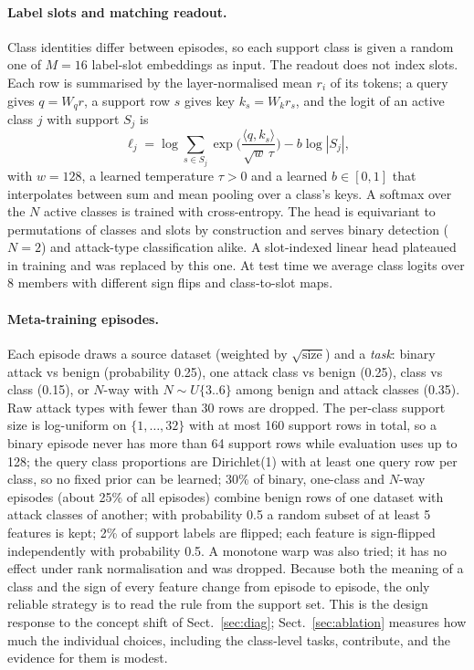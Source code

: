 \documentclass[pdflatex,sn-mathphys-num]{sn-jnl}%
\begin{document}
\paragraph{Label slots and matching readout.}
Class identities differ between episodes, so each support class is given a random one of $M=16$ label-slot embeddings as input.
The readout does not index slots.
Each row is summarised by the layer-normalised mean $r_i$ of its tokens; a query gives $q=W_q r$, a support row $s$ gives key $k_s=W_k r_s$, and the logit of an active class $j$ with support $S_j$ is
\begin{equation}
\ell_j=\log\!\!\sum_{s\in S_j}\exp\!\Big(\frac{\langle q,k_s\rangle}{\sqrt{w}\,\tau}\Big)-b\log|S_j|,
\end{equation}
with $w=128$, a learned temperature $\tau>0$ and a learned $b\in[0,1]$ that interpolates between sum and mean pooling over a class's keys.
A softmax over the $N$ active classes is trained with cross-entropy.
The head is equivariant to permutations of classes and slots by construction and serves binary detection ($N=2$) and attack-type classification alike.
A slot-indexed linear head plateaued in training and was replaced by this one.
At test time we average class logits over 8 members with different sign flips and class-to-slot maps.

\paragraph{Meta-training episodes.}
Each episode draws a source dataset (weighted by $\sqrt{\text{size}}$) and a \emph{task}: binary attack vs benign (probability 0.25), one attack class vs benign (0.25), class vs class (0.15), or $N$-way with $N\sim U\{3..6\}$ among benign and attack classes (0.35).
Raw attack types with fewer than 30 rows are dropped.
The per-class support size is log-uniform on $\{1,\dots,32\}$ with at most 160 support rows in total, so a binary episode never has more than 64 support rows while evaluation uses up to 128; the query class proportions are Dirichlet(1) with at least one query row per class, so no fixed prior can be learned; 30\% of binary, one-class and $N$-way episodes (about 25\% of all episodes) combine benign rows of one dataset with attack classes of another; with probability 0.5 a random subset of at least 5 features is kept; 2\% of support labels are flipped; each feature is sign-flipped independently with probability 0.5.
A monotone warp was also tried; it has no effect under rank normalisation and was dropped.
Because both the meaning of a class and the sign of every feature change from episode to episode, the only reliable strategy is to read the rule from the support set.
This is the design response to the concept shift of Sect.~\ref{sec:diag}; Sect.~\ref{sec:ablation} measures how much the individual choices, including the class-level tasks, contribute, and the evidence for them is modest.
\end{document}
